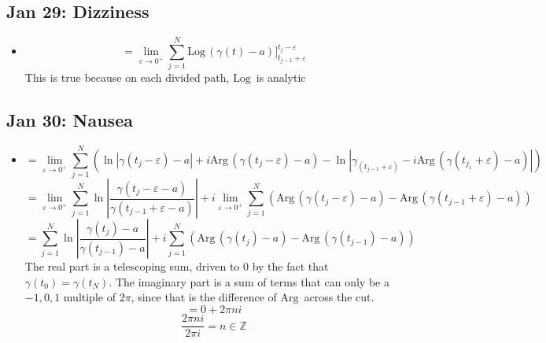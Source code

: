 \documentclass[10pt, oneside]{article}
\let\ep\varepsilon
\newcommand{\Z}{\mathbb{Z}}
\newcommand{\Arg}{\text{Arg} \,}
\newcommand{\Log}{\text{Log} \,}
\begin{document}
\subsection{Jan 29: Dizziness}
\begin{itemize}
    \item \[= \lim_{\ep \rightarrow 0^+} \sum_{j=1}^N \Log(\gamma(t) - a) \big]_{t_{j-1} + \ep}^{t_j - \ep}\]
        This is true because on each divided path, $\Log$ is analytic
\end{itemize}

\subsection{Jan 30: Nausea}
\begin{itemize}
    \item \[= \lim_{\ep \rightarrow 0^+} \sum_{j=1}^N (\ln|\gamma(t_j - \ep) - a| + i\Arg(\gamma(t_j - \ep) - a) - \ln|\gamma_(t_{j-1} + \ep) - i\Arg(\gamma(t_{j_1} + \ep) - a)|)\]
        \[= \lim_{\ep \rightarrow 0^+} \sum_{j=1}^N \ln\left| \frac{\gamma(t_j - \ep - a)}{\gamma(t_{j-1} + \ep - a)} \right| + i \lim_{\ep \rightarrow 0^+} \sum_{j=1}^N (\Arg(\gamma(t_j - \ep) - a) - \Arg(\gamma(t_{j-1} + \ep) - a))\]
        \[= \sum_{j=1}^N \ln\left| \frac{\gamma(t_j) - a}{\gamma(t_{j-1}) - a} \right| + i \sum_{j=1}^N (\Arg(\gamma(t_j) - a) - \Arg(\gamma(t_{j-1}) - a))\]
        The real part is a telescoping sum, driven to $0$ by the fact that $\gamma(t_0) = \gamma(t_N)$. The imaginary part is a sum of terms that can only be a $-1,0,1$ multiple of $2\pi$, since that is the difference of $\Arg$ across the cut.
        \[= 0 + 2\pi ni\]
        \[\frac{2\pi n i}{2 \pi i} = n \in \Z\]
\end{itemize}
\end{document}
